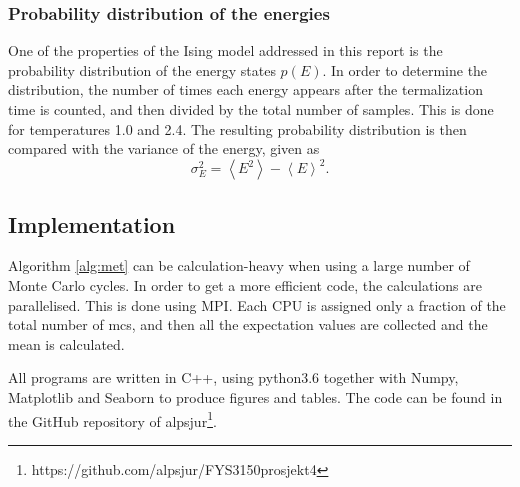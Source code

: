 \subsubsection{Probability distribution of the energies}
One of the properties of the Ising model addressed in this report is the probability distribution of the energy states $p(E)$. In order to determine the distribution, the number of times each energy appears after the termalization time is counted, and then divided by the total number of samples. This is done for temperatures 1.0 and 2.4. The resulting probability distribution is then compared with the variance of the energy, given as
\begin{equation}
 \sigma_E^2 = \left\langle E^2\right\rangle - \left\langle E\right\rangle^2 .
\end{equation}  
 
\subsection{Implementation}
Algorithm \ref{alg:met} can be calculation-heavy when using a large number of Monte Carlo cycles. In order to get a more efficient code, the calculations are parallelised. This is done using MPI. Each CPU is assigned only a fraction of the total number of mcs, and then all the  expectation values are collected and the mean is calculated. 

All programs are written in C++, using python3.6 together with Numpy, Matplotlib and Seaborn to produce figures and tables. The code can be found in the GitHub repository of alpsjur\footnote{https://github.com/alpsjur/FYS3150prosjekt4}.